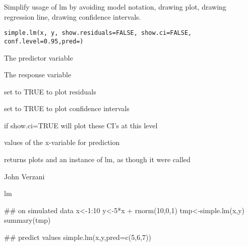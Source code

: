 \begin{Description}\relax
Simplify usage of lm by avoiding model notation, drawing plot, drawing 
regression line, drawing confidence intervals.
\end{Description}
\begin{Usage}
\begin{verbatim}
simple.lm(x, y, show.residuals=FALSE, show.ci=FALSE, conf.level=0.95,pred=)
\end{verbatim}
\end{Usage}
\begin{Arguments}
\begin{ldescription}
\item[\code{x}] The predictor variable 
\item[\code{y}] The response variable 
\item[\code{show.residuals}] set to TRUE to plot residuals 
\item[\code{show.ci}] set to TRUE to plot confidence intervals 
\item[\code{conf.level}] if show.ci=TRUE will plot these CI's at this level

\item[\code{pred}] values of the x-variable for prediction
\end{ldescription}
\end{Arguments}
\begin{Value}
returns plots and an instance of lm, as though it were called
\end{Value}
\begin{Author}\relax
John Verzani
\end{Author}
\begin{SeeAlso}\relax
lm
\end{SeeAlso}
\begin{Examples}
\begin{ExampleCode}
## on simulated data
x<-1:10
y<-5*x + rnorm(10,0,1)
tmp<-simple.lm(x,y)
summary(tmp)

## predict values
simple.lm(x,y,pred=c(5,6,7))
\end{ExampleCode}
\end{Examples}

